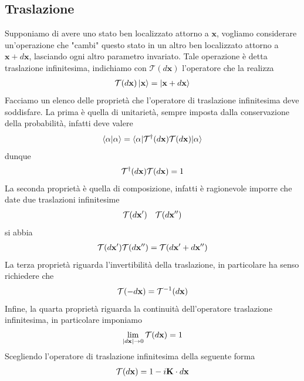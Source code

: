 \documentclass{article}
\begin{document}
\subsection{Traslazione}
Supponiamo di avere uno stato ben localizzato attorno a $\mathbf{x}$, vogliamo considerare un'operazione che "cambi" questo stato in un altro ben localizzato attorno a $\mathbf{x} + d\mathbf{x}$, lasciando ogni altro parametro invariato. Tale operazione è detta traslazione infinitesima, indichiamo con $\mathcal{T}(d\mathbf{x})$ l'operatore che la realizza
\begin{gather}
    \mathcal{T}(d\mathbf{x})\ket{\mathbf{x}} = \ket{\mathbf{x} + d\mathbf{x}} \notag
\end{gather}
Facciamo un elenco delle proprietà che l'operatore di traslazione infinitesima deve soddisfare. La prima è quella di unitarietà, sempre imposta dalla conservazione della probabilità, infatti deve valere
\begin{gather}
    \braket{\alpha|\alpha} = \braket{\alpha |\mathcal{T}^\dagger(d\mathbf{x})\mathcal{T}(d\mathbf{x}) |\alpha} \notag
\end{gather}
dunque
\begin{gather}
    \mathcal{T}^\dagger(d\mathbf{x})\mathcal{T}(d\mathbf{x}) = 1 \notag
\end{gather}
La seconda proprietà è quella di composizione, infatti è ragionevole imporre che date due traslazioni infinitesime
\begin{gather}
    \mathcal{T}(d\mathbf{x'}) \quad \mathcal{T}(d\mathbf{x''}) \notag
\end{gather}
si abbia
\begin{gather}
    \mathcal{T}(d\mathbf{x'})\mathcal{T}(d\mathbf{x''}) = \mathcal{T}(d\mathbf{x'} + d\mathbf{x''}) \notag
\end{gather}
La terza proprietà riguarda l'invertibilità della traslazione, in particolare ha senso richiedere che
\begin{gather}
    \mathcal{T}(-d\mathbf{x}) = \mathcal{T}^{-1}(d\mathbf{x}) \notag
\end{gather}
Infine, la quarta proprietà riguarda la continuità dell'operatore traslazione infinitesima, in particolare imponiamo
\begin{gather}
    \lim_{|d\mathbf{x}| \rightarrow 0} \mathcal{T}(d\mathbf{x}) = 1 \notag
\end{gather}
Scegliendo l'operatore di traslazione infinitesima della seguente forma
\begin{gather}
    \mathcal{T}(d\mathbf{x}) = 1 - i\mathbf{K}\cdot d\mathbf{x} \notag
\end{gather}
\end{document}
